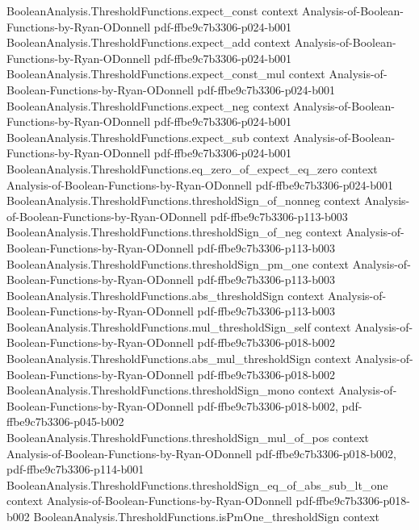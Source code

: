 \begin{theorem}
\proofstep
  {BooleanAnalysis.ThresholdFunctions.expect_const}
  {context}
  {Analysis-of-Boolean-Functions-by-Ryan-ODonnell}
  {pdf-ffbe9c7b3306-p024-b001}
\proofstep
  {BooleanAnalysis.ThresholdFunctions.expect_add}
  {context}
  {Analysis-of-Boolean-Functions-by-Ryan-ODonnell}
  {pdf-ffbe9c7b3306-p024-b001}
\proofstep
  {BooleanAnalysis.ThresholdFunctions.expect_const_mul}
  {context}
  {Analysis-of-Boolean-Functions-by-Ryan-ODonnell}
  {pdf-ffbe9c7b3306-p024-b001}
\proofstep
  {BooleanAnalysis.ThresholdFunctions.expect_neg}
  {context}
  {Analysis-of-Boolean-Functions-by-Ryan-ODonnell}
  {pdf-ffbe9c7b3306-p024-b001}
\proofstep
  {BooleanAnalysis.ThresholdFunctions.expect_sub}
  {context}
  {Analysis-of-Boolean-Functions-by-Ryan-ODonnell}
  {pdf-ffbe9c7b3306-p024-b001}
\proofstep
  {BooleanAnalysis.ThresholdFunctions.eq_zero_of_expect_eq_zero}
  {context}
  {Analysis-of-Boolean-Functions-by-Ryan-ODonnell}
  {pdf-ffbe9c7b3306-p024-b001}
\proofstep
  {BooleanAnalysis.ThresholdFunctions.thresholdSign_of_nonneg}
  {context}
  {Analysis-of-Boolean-Functions-by-Ryan-ODonnell}
  {pdf-ffbe9c7b3306-p113-b003}
\proofstep
  {BooleanAnalysis.ThresholdFunctions.thresholdSign_of_neg}
  {context}
  {Analysis-of-Boolean-Functions-by-Ryan-ODonnell}
  {pdf-ffbe9c7b3306-p113-b003}
\proofstep
  {BooleanAnalysis.ThresholdFunctions.thresholdSign_pm_one}
  {context}
  {Analysis-of-Boolean-Functions-by-Ryan-ODonnell}
  {pdf-ffbe9c7b3306-p113-b003}
\proofstep
  {BooleanAnalysis.ThresholdFunctions.abs_thresholdSign}
  {context}
  {Analysis-of-Boolean-Functions-by-Ryan-ODonnell}
  {pdf-ffbe9c7b3306-p113-b003}
\proofstep
  {BooleanAnalysis.ThresholdFunctions.mul_thresholdSign_self}
  {context}
  {Analysis-of-Boolean-Functions-by-Ryan-ODonnell}
  {pdf-ffbe9c7b3306-p018-b002}
\proofstep
  {BooleanAnalysis.ThresholdFunctions.abs_mul_thresholdSign}
  {context}
  {Analysis-of-Boolean-Functions-by-Ryan-ODonnell}
  {pdf-ffbe9c7b3306-p018-b002}
\proofstep
  {BooleanAnalysis.ThresholdFunctions.thresholdSign_mono}
  {context}
  {Analysis-of-Boolean-Functions-by-Ryan-ODonnell}
  {pdf-ffbe9c7b3306-p018-b002,
    pdf-ffbe9c7b3306-p045-b002}
\proofstep
  {BooleanAnalysis.ThresholdFunctions.thresholdSign_mul_of_pos}
  {context}
  {Analysis-of-Boolean-Functions-by-Ryan-ODonnell}
  {pdf-ffbe9c7b3306-p018-b002,
    pdf-ffbe9c7b3306-p114-b001}
\proofstep
  {BooleanAnalysis.ThresholdFunctions.thresholdSign_eq_of_abs_sub_lt_one}
  {context}
  {Analysis-of-Boolean-Functions-by-Ryan-ODonnell}
  {pdf-ffbe9c7b3306-p018-b002}
\proofstep
  {BooleanAnalysis.ThresholdFunctions.isPmOne_thresholdSign}
  {context}

\end{theorem}
